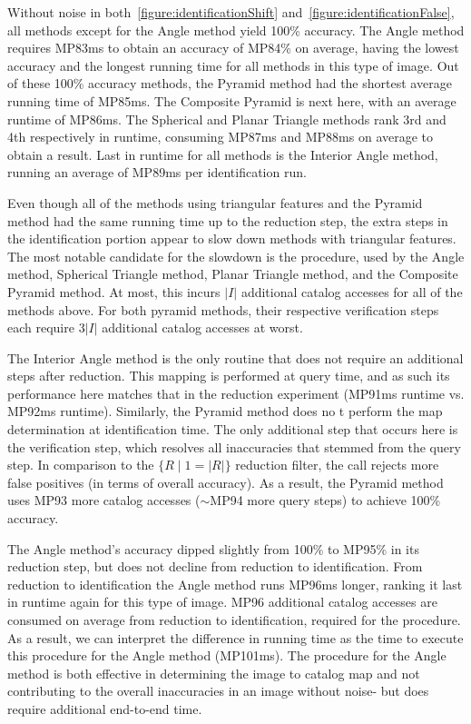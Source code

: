 Without noise in both~\autoref{figure:identificationShift} and~\autoref{figure:identificationFalse}, all methods except
for the Angle method yield 100\% accuracy.
The Angle method requires MP83ms to obtain an accuracy of MP84\% on average, having the lowest accuracy and the longest
running time for all methods in this type of image.
Out of these 100\% accuracy methods, the Pyramid method had the shortest average running time of MP85ms.
The Composite Pyramid is next here, with an average runtime of MP86ms.
The Spherical and Planar Triangle methods rank 3rd and 4th respectively in runtime, consuming MP87ms and MP88ms on
average to obtain a result.
Last in runtime for all methods is the Interior Angle method, running an average of MP89ms per identification run.

Even though all of the methods using triangular features and the Pyramid method had the same running time up to the
reduction step, the extra steps in the identification portion appear to slow down methods with triangular features.
The most notable candidate for the slowdown is the  procedure, used by the Angle method, Spherical Triangle
method, Planar Triangle method, and the Composite Pyramid method.
At most, this incurs $|I|$ additional catalog accesses for all of the methods above.
For both pyramid methods, their respective verification steps each require $3|I|$ additional catalog accesses at worst.

The Interior Angle method is the only routine that does not require an additional steps after reduction.
This mapping is performed at query time, and as such its performance here matches that in the reduction experiment
(MP91ms runtime vs. MP92ms runtime).
Similarly, the Pyramid method does no t perform the map determination at identification time.
The only additional step that occurs here is the verification step, which resolves all inaccuracies that stemmed
from the query step.
In comparison to the $\{ R \mid 1 = |R|\}$ reduction filter, the  call rejects more false positives
(in terms of overall accuracy).
As a result, the Pyramid method uses MP93 more catalog accesses ($\sim$MP94 more query steps) to achieve 100\% accuracy.

The Angle method's accuracy dipped slightly from 100\% to MP95\% in its reduction step, but does not decline from
reduction to identification.
From reduction to identification the Angle method runs MP96ms longer, ranking it last in runtime again for this
type of image.
MP96 additional catalog accesses are consumed on average from reduction to identification, required for the
 procedure.
As a result, we can interpret the difference in running time as the time to execute this procedure for the Angle method
(MP101ms).
The  procedure for the Angle method is both effective in determining the image to catalog map and not
contributing to the overall inaccuracies in an image without noise- but does require additional end-to-end time.

